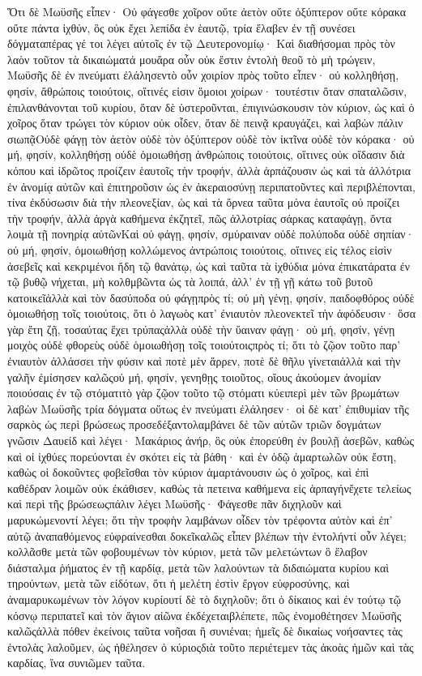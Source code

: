 Ὅτι δὲ Μωϋσῆς εἶπεν· Οὐ φάγεσθε χοῖρον οὔτε ἀετὸν οὔτε ὀξύπτερον οὔτε κόρακα οὔτε πάντα ἰχθύν, ὃς οὐκ ἔχει λεπίδα ἐν ἑαυτῷ, τρία ἔλαβεν ἐν τῇ συνέσει δόγματαπέρας γέ τοι λέγει αὐτοῖς ἐν τῷ Δευτερονομίῳ· Καὶ διαθήσομαι πρὸς τὸν λαὸν τοῦτον τὰ δικαιώματά μουἄρα οὖν οὐκ ἔστιν ἐντολὴ θεοῦ τὸ μὴ τρώγειν, Μωϋσῆς δὲ ἐν πνεύματι ἐλάλησεντὸ οὖν χοιρίον πρὸς τοῦτο εἶπεν· οὐ κολληθήσῃ, φησίν, ἄθρώποις τοιούτοις, οἵτινές εἰσιν ὅμοιοι χοίρων· τουτέστιν ὅταν σπαταλῶσιν, ἐπιλανθάνονται τοῦ κυρίου, ὅταν δὲ ὑστεροῦνται, ἐπιγινώσκουσιν τὸν κύριον, ὡς καὶ ὁ χοῖρος ὅταν τρώγει τὸν κύριον οὐκ οἶδεν, ὅταν δὲ πεινᾷ κραυγάζει, καὶ λαβὼν πάλιν σιωπᾷΟὐδὲ φάγῃ τὸν ἀετὸν οὐδὲ τὸν ὀξύπτερον οὐδὲ τὸν ἰκτῖνα οὐδὲ τὸν κόρακα· οὐ μή, φησίν, κολληθήσῃ οὐδὲ ὁμοιωθήσῃ ἀνθρώποις τοιούτοις, οἵτινες οὐκ οἴδασιν διὰ κόπου καὶ ἰδρῶτος προίζειν ἑαυτοῖς τὴν τροφήν, ἀλλὰ ἁρπάζουσιν ὡς καὶ τὰ ἀλλότρια ἐν ἀνομίᾳ αὐτῶν καὶ ἐπιτηροῦσιν ὡς ἐν ἀκεραιοσύνῃ περιπατοῦντες καὶ περιβλέπονται, τίνα ἐκδύσωσιν διὰ τὴν πλεονεξίαν, ὡς καὶ τὰ ὄρνεα ταῦτα μόνα ἑαυτοῖς οὐ προίζει τὴν τροφήν, ἀλλὰ ἀργὰ καθήμενα ἐκζητεῖ, πῶς ἀλλοτρίας σάρκας καταφάγῃ, ὄντα λοιμὰ τῇ πονηρίᾳ αὐτῶνΚαὶ οὐ φάγῃ, φησίν, σμύραιναν οὐδὲ πολύποδα οὐδὲ σηπίαν· οὐ μή, φησίν, ὁμοιωθήσῃ κολλώμενος ἀντρώποις τοιούτοις, οἵτινες εἰς τέλος εἰσὶν ἀσεβεῖς καὶ κεκριμένοι ἤδη τῷ θανάτῳ, ὡς καὶ ταῦτα τὰ ἰχθύδια μόνα ἐπικατάρατα ἐν τῷ βυθῷ νήχεται, μὴ κολθμβῶντα ὡς τὰ λοιπά, ἀλλ’ ἐν τῇ γῇ κάτω τοῦ βυτοῦ κατοικεῖἀλλὰ καὶ τὸν δασύποδα οὐ φάγῃπρὸς τί; οὐ μὴ γένῃ, φησίν, παιδοφθόρος οὐδὲ ὁμοιωθήσῃ τοῖς τοιούτοις, ὅτι ὁ λαγωὸς κατ’ ἐνιαυτὸν πλεονεκτεῖ τὴν ἀφόδευσιν· ὅσα γὰρ ἔτη ζῇ, τοσαύτας ἔχει τρύπαςἀλλὰ οὐδὲ τὴν ὕαιναν φάγῃ· οὐ μή, φησίν, γένῃ μοιχὸς οὐδὲ φθορεὺς οὐδὲ ὁμοιωθήσῃ τοῖς τοιούτοιςπρὸς τί; ὅτι τὸ ζῷον τοῦτο παρ’ ἐνιαυτὸν ἀλλάσσει τὴν φύσιν καὶ ποτὲ μὲν ἄρρεν, ποτὲ δὲ θῆλυ γίνεταιἀλλὰ καὶ τὴν γαλῆν ἐμίσησεν καλῶςοὐ μή, φησίν, γενηθῃς τοιοῦτος, οἵους ἀκούομεν ἀνομίαν ποιούσαις ἐν τῷ στόματιτὸ γὰρ ζῷον τοῦτο τῷ στόματι κύειπερὶ μὲν τῶν βρωμάτων λαβὼν Μωϋσῆς τρία δόγματα οὕτως ἐν πνεύματι ἐλάλησεν· οἱ δὲ κατ’ ἐπιθυμίαν τῆς σαρκὸς ὡς περὶ βρώσεως προσεδέξαντολαμβάνει δὲ τῶν αὐτῶν τριῶν δογμάτων γνῶσιν Δαυείδ καὶ λέγει· Μακάριος ἀνήρ, ὃς οὐκ ἐπορεύθη ἐν βουλῇ ἀσεβῶν, καθὼς καὶ οἱ ἰχθύες πορεύονται ἐν σκότει εἰς τὰ βάθη· καὶ ἐν ὁδῷ ἁμαρτωλῶν οὐκ ἔστη, καθὼς οἱ δοκοῦντες φοβεῖσθαι τὸν κύριον ἁμαρτάνουσιν ὡς ὁ χοῖρος, καὶ ἐπὶ καθέδραν λοιμῶν οὐκ ἐκάθισεν, καθὼς τὰ πετεινα καθήμενα εἰς ἁρπαγήνἔχετε τελείως καὶ περὶ τῆς βρώσεωςπάλιν λέγει Μωϋσῆς· Φάγεσθε πᾶν διχηλοῦν καὶ μαρυκώμενοντί λέγει; ὅτι τὴν τροφὴν λαμβάνων οἶδεν τὸν τρέφοντα αὐτὸν καὶ ἐπ’ αὐτῷ ἀναπαθόμενος εὐφραίνεσθαι δοκεῖκαλῶς εἶπεν βλέπων τὴν ἐντολήντί οὖν λέγει; κολλᾶσθε μετὰ τῶν φοβουμένων τὸν κύριον, μετὰ τῶν μελετώντων ὃ ἔλαβον διάσταλμα ῥήματος ἐν τῇ καρδίᾳ, μετὰ τῶν λαλούντων τὰ διδαιώματα κυρίου καὶ τηρούντων, μετὰ τῶν εἰδότων, ὅτι ἡ μελέτη ἐστὶν ἔργον εὐφροσύνης, καὶ ἀναμαρυκωμένων τὸν λόγον κυρίουτί δὲ τὸ διχηλοῦν; ὅτι ὁ δίκαιος καὶ ἐν τούτῳ τῷ κόσνῳ περιπατεῖ καὶ τὸν ἅγιον αἰῶνα ἐκδέχεταιβλέπετε, πῶς ἐνομοθέτησεν Μωϋσῆς καλῶςἀλλὰ πόθεν ἐκείνοις ταῦτα νοῆσαι ἢ συνιέναι; ἡμεῖς δὲ δικαίως νοήσαντες τὰς ἐντολὰς λαλοῦμεν, ὡς ἠθέλησεν ὁ κύριοςδιὰ τοῦτο περιέτεμεν τὰς ἀκοὰς ἡμῶν καὶ τὰς καρδίας, ἵνα συνιῶμεν ταῦτα.
